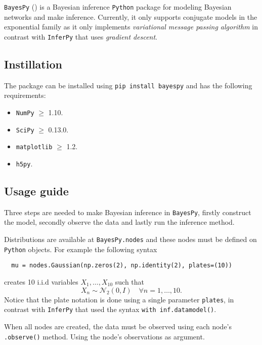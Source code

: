 
\texttt{BayesPy} (\cite{BayesPy}) is a Bayesian inference \texttt{Python} package for modeling Bayesian networks and make inference. Currently, it only supports conjugate models in the exponential family as it only implements \emph{variational message passing algorithm} in contrast with \texttt{InferPy} that uses \emph{gradient descent}.

\subsection{Instillation}

The package can be installed using \texttt{pip install bayespy} and has the following requirements:
\begin{itemize}
  \item \texttt{NumPy} \(\geq\) 1.10.
  \item \texttt{SciPy} \(\geq\) 0.13.0.
  \item \texttt{matplotlib} \(\geq\) 1.2.
  \item \texttt{h5py}.
\end{itemize}

\subsection{Usage guide}

Three steps are needed to make Bayesian inference in \texttt{BayesPy}, firstly construct the model, secondly observe the data and lastly run the inference method.

Distributions are available at \texttt{BayesPy.nodes} and these nodes must be defined on \texttt{Python} objects. For example the following syntax
\begin{verbatim}
  mu = nodes.Gaussian(np.zeros(2), np.identity(2), plates=(10))
\end{verbatim}
creates 10 i.i.d variables \(X_{1},\dots,X_{10}\)  such that
\[
  X_{n} \sim \mathcal{N}_{2}(0, I) \quad \forall n =1,\dots,10.
\]
Notice that the plate notation is done using a single parameter \texttt{plates}, in contrast with \texttt{InferPy} that used the syntax \texttt{with inf.datamodel()}.

When all nodes are created, the data must be observed using each node's \texttt{.observe()} method. Using the node's observations as argument.

